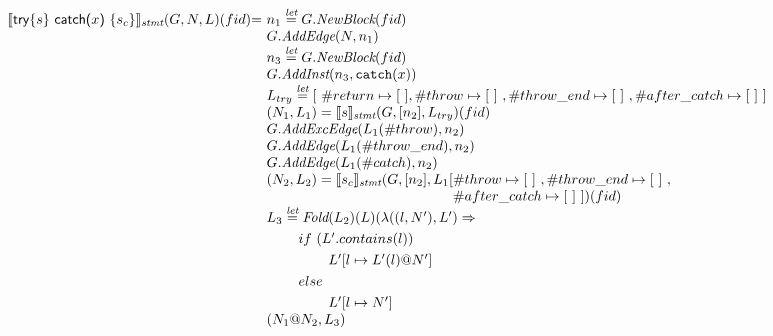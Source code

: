 \[
\begin{array}{l@{}l@{~}l}
	


\transfun{\ircfgtrycat{s}{x}{s_c}}_{\emph{stmt}}(G,N,L)(fid) & = &
	n_1 \letval G.\emph{NewBlock}(fid)\\
	& & G.\emph{AddEdge}(N,n_1)\\
	& & n_3 \letval G.\emph{NewBlock}(fid)\\
	& & G.\emph{AddInst}(n_3,\TT{catch}(x))\\
	& & L_{try} \letval [\ \#return \mapsto [\ ], \#throw \mapsto [\ ]\ , \#throw\_end \mapsto [\ ]\ ,\#after\_catch \mapsto [\ ]\ ] \\
	& & (N_1,L_1) = \transfun{s}_{\emph{stmt}}(G,[n_2],L_{try})(fid)\\
	& & G.\emph{AddExcEdge}(L_1(\#throw),n_2)\\
	& & G.\emph{AddEdge}(L_1(\#throw\_end),n_2)\\

	& & G.\emph{AddEdge}(L_1(\# catch),n_2)\\

	& & (N_2,L_2) = \transfun{s_c}_{\emph{stmt}}(G,[n_2],L_1[\#throw \mapsto [\ ]\ ,\#throw\_end \mapsto [\ ]\ , \\
	& & \phantom{(N_2,L_2) = \transfun{s_c}_{\emph{stmt}}(G,[n_2],L_1[} \#after\_catch \mapsto [\ ]\ ])(fid)\\
	& & L_3 \letval \Fold(L_2)(L)(\lambda((l,N'),L') \Rightarrow\\
	& & \phantom{L_3 \letval}if\ (L'.contains(l))\\
	& & \phantom{L_3 \letval \Fold} L'[l \mapsto L'(l)@N']\\
	& & \phantom{L_3 \letval}else\\
	& & \phantom{L_3 \letval \Fold} L'[l \mapsto N']\\
	& & (N_1@N_2, L_3)\\
	& & \\ 
	

\end{array}\]
